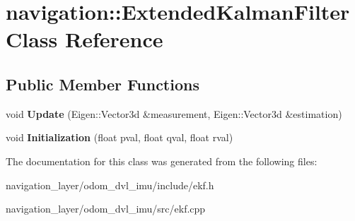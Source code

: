 \hypertarget{classnavigation_1_1ExtendedKalmanFilter}{}\section{navigation\+:\+:Extended\+Kalman\+Filter Class Reference}
\label{classnavigation_1_1ExtendedKalmanFilter}
\subsection*{Public Member Functions}
\begin{DoxyCompactItemize}
\item 
\mbox{\label{classnavigation_1_1ExtendedKalmanFilter_aa2e08d1aac6aa0abe3226d223688f6cb}} 
void {\bfseries Update} (Eigen\+::\+Vector3d \&measurement, Eigen\+::\+Vector3d \&estimation)
\item 
\mbox{\label{classnavigation_1_1ExtendedKalmanFilter_acc5c4a9358d53a4198bb1aa15b7e8b91}} 
void {\bfseries Initialization} (float pval, float qval, float rval)
\end{DoxyCompactItemize}


The documentation for this class was generated from the following files\+:\begin{DoxyCompactItemize}
\item 
navigation\+\_\+layer/odom\+\_\+dvl\+\_\+imu/include/ekf.\+h\item 
navigation\+\_\+layer/odom\+\_\+dvl\+\_\+imu/src/ekf.\+cpp\end{DoxyCompactItemize}
